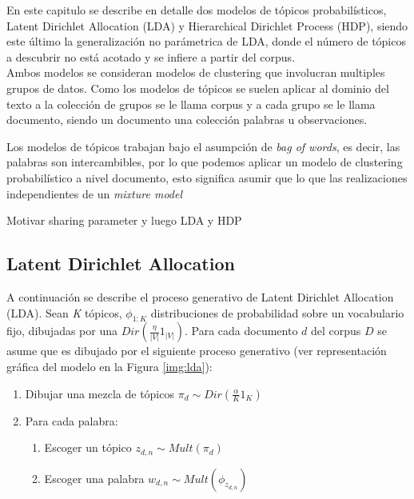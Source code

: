 \documentclass[letterpaper,12pt,oneside]{book} %
\begin{document}
En este capitulo se describe en detalle dos modelos de tópicos probabilísticos,  Latent Dirichlet Allocation (LDA) y Hierarchical Dirichlet Process (HDP), siendo este último la generalización no parámetrica de LDA, donde el número de tópicos a descubrir no está acotado y se infiere a partir del corpus.\\

Ambos modelos se consideran modelos de clustering que involucran multiples grupos de datos. Como los modelos de tópicos se suelen aplicar al dominio del texto a la colección de grupos se le llama corpus y a cada grupo se le llama documento, siendo un documento una colección palabras u observaciones. 

Los modelos de tópicos trabajan bajo el asumpción de \textit{bag of words}, es decir, las palabras son intercambibles, por lo que podemos aplicar un modelo de clustering probabilístico a nivel documento, esto significa asumir que lo que las realizaciones independientes de un \textit{mixture model}

Motivar sharing parameter y luego LDA y HDP

\subsection{Latent Dirichlet Allocation}


A continuación se describe el proceso generativo de Latent Dirichlet Allocation (LDA). Sean \textit{K} tópicos, $\phi_{1:K}$ distribuciones de probabilidad sobre un vocabulario fijo, dibujadas por una $Dir(\frac{\eta}{|V|}1_{|V|})$. Para cada documento $d$ del corpus $D$ se asume que es dibujado por el siguiente proceso generativo (ver representación gráfica del modelo en la Figura \ref{img:lda}):
\begin{enumerate}
    \item Dibujar una mezcla de tópicos $\pi_{d}\sim Dir(\frac{\alpha}{K}1_{K})$
    \item Para cada palabra:
    \begin{enumerate}
        \item Escoger un tópico $z_{d,n}\sim Mult(\pi_{d})$
        \item Escoger una palabra $w_{d,n}\sim Mult(\phi_{z_{d,n}})$
    \end{enumerate}
\end{enumerate}
\end{document}
